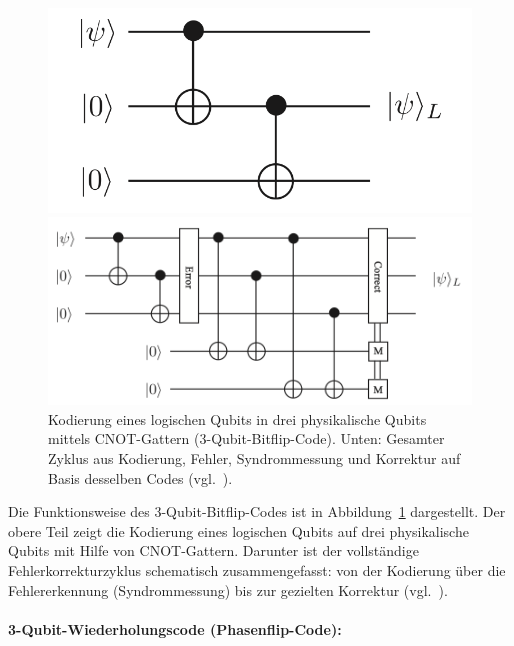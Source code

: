 \begin{figure}[htbp]
  \centering
  
  \includegraphics[width=0.5\linewidth]{images/error-correction/Abb1_BitFlipCode_1.png}
  
  \vspace{1.2em} %
  
  \includegraphics[width=0.75\linewidth]{images/error-correction/Abb2_BitFlipCode_2.png}
  
  \caption{Kodierung eines logischen Qubits in drei physikalische Qubits mittels CNOT-Gattern (3-Qubit-Bitflip-Code). Unten: Gesamter Zyklus aus Kodierung, Fehler, Syndrommessung und Korrektur auf Basis desselben Codes (vgl.~\cite[8]{devitt_quantum_2013}).}
  \label{fig:bitflipcode}
\end{figure}

Die Funktionsweise des 3-Qubit-Bitflip-Codes ist in Abbildung~\ref{fig:bitflipcode} dargestellt.
Der obere Teil zeigt die Kodierung eines logischen Qubits auf drei physikalische Qubits mit Hilfe von CNOT-Gattern.
Darunter ist der vollständige Fehlerkorrekturzyklus schematisch zusammengefasst: von der Kodierung über die Fehlererkennung (Syndrommessung) bis zur gezielten Korrektur (vgl.~\cite[8]{devitt_quantum_2013}).
\medskip
\paragraph{3-Qubit-Wiederholungscode (Phasenflip-Code):}\label{chap:QEC1.4}

